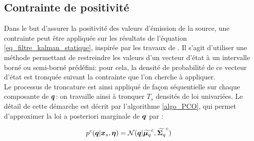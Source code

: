 \subsection{Contrainte de positivité}

Dans le but d'assurer la positivité des valeurs d'émission de la source, une contrainte peut être appliquée sur les résultats de l'équation \eqref{eq_filtre_kalman_statique}, inspirée par les travaux de \cite{Simon2010}. Il s'agit d'utiliser une méthode permettant de restreindre les valeurs d'un vecteur d'état à un intervalle borné ou semi-borné prédéfini: pour cela, la densité de probabilité de ce vecteur d'état est tronquée suivant la contrainte que l'on cherche à appliquer. \\

Le processus de troncature est ainsi appliqué de façon séquentielle sur chaque composante de ${\bm{q}}$: on travaille ainsi à tronquer $T_s$ densités de loi univariées. Le détail de cette démarche est décrit par l'algorithme \ref{algo_PCO}, qui permet d'approximer la loi a posteriori marginale de ${\bm{q}}$ par : 

\begin{equation}
p^c({\bm{q}} | {\bm{x}_s}, {\bm{\eta}}) = \mathcal{N}({\bm{q}} | {\widetilde{\bm{\mu}_q}}^c, {\widetilde{\bm{\Sigma}_q}}^c)
\label{eq_AE_16}
\end{equation}

